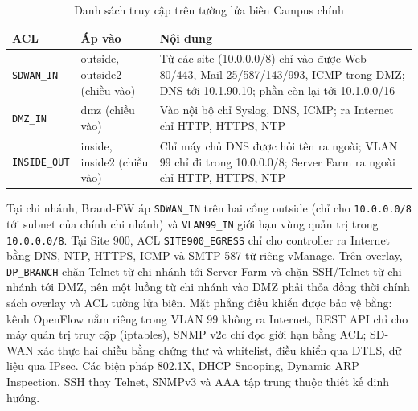 \begin{table}[H]
    \centering
    \small
    \caption{Danh sách truy cập trên tường lửa biên Campus chính}
    \label{tab:acl_fw}
    \begin{tabularx}{\textwidth}{|L{2.6cm}|L{3.3cm}|Y|}
        \hline
        \textbf{ACL} & \textbf{Áp vào} & \textbf{Nội dung} \\
        \hline
        \texttt{SDWAN\_IN} & outside, outside2 (chiều vào) & Từ các site (10.0.0.0/8) chỉ vào được Web 80/443, Mail 25/587/143/993, ICMP trong DMZ; DNS tới 10.1.90.10; phần còn lại tới 10.1.0.0/16 \\
        \hline
        \texttt{DMZ\_IN} & dmz (chiều vào) & Vào nội bộ chỉ Syslog, DNS, ICMP; ra Internet chỉ HTTP, HTTPS, NTP \\
        \hline
        \texttt{INSIDE\_OUT} & inside, inside2 (chiều vào) & Chỉ máy chủ DNS được hỏi tên ra ngoài; VLAN 99 chỉ đi trong 10.0.0.0/8; Server Farm ra ngoài chỉ HTTP, HTTPS, NTP \\
        \hline
    \end{tabularx}
\end{table}

Tại chi nhánh, Brand-FW áp \texttt{SDWAN\_IN} trên hai cổng outside (chỉ cho \texttt{10.0.0.0/8} tới subnet của chính chi nhánh) và \texttt{VLAN99\_IN} giới hạn vùng quản trị trong \texttt{10.0.0.0/8}. Tại Site 900, ACL \texttt{SITE900\_EGRESS} chỉ cho controller ra Internet bằng DNS, NTP, HTTPS, ICMP và SMTP 587 từ riêng vManage. Trên overlay, \texttt{DP\_BRANCH} chặn Telnet từ chi nhánh tới Server Farm và chặn SSH/Telnet từ chi nhánh tới DMZ, nên một luồng từ chi nhánh vào DMZ phải thỏa đồng thời chính sách overlay và ACL tường lửa biên. Mặt phẳng điều khiển được bảo vệ bằng: kênh OpenFlow nằm riêng trong VLAN 99 không ra Internet, REST API chỉ cho máy quản trị truy cập (iptables), SNMP v2c chỉ đọc giới hạn bằng ACL; SD-WAN xác thực hai chiều bằng chứng thư và whitelist, điều khiển qua DTLS, dữ liệu qua IPsec. Các biện pháp 802.1X, DHCP Snooping, Dynamic ARP Inspection, SSH thay Telnet, SNMPv3 và AAA tập trung thuộc thiết kế định hướng.
